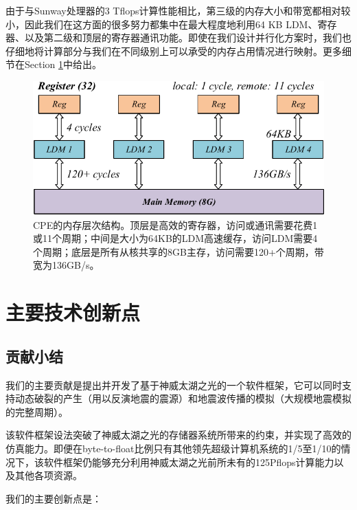 \documentclass[degree=doctor]{thuthesis}
\begin{document}
由于与Sunway处理器的3 Tflops计算性能相比，第三级的内存大小和带宽都相对较小，因此我们在这方面的很多努力都集中在最大程度地利用64 KB LDM、寄存器、以及第二级和顶层的寄存器通讯功能。即使在我们设计并行化方案时，我们也仔细地将计算部分与我们在不同级别上可以承受的内存占用情况进行映射。更多细节在Section \ref{sec:contribution}中给出。

\begin{figure}[h]
\centering
\includegraphics[width=.9\columnwidth]{memory_hierarchy.pdf}
\caption{CPE的内存层次结构。顶层是高效的寄存器，访问或通讯需要花费1或11个周期；中间是大小为64KB的LDM高速缓存，访问LDM需要4个周期；底层是所有从核共享的8GB主存，访问需要120+个周期，带宽为136GB/s。}
\label{fig:sunway_mem}
\end{figure}

\section{主要技术创新点}
\label{sec:contribution}

\subsection{贡献小结}


我们的主要贡献是提出并开发了基于神威太湖之光的一个软件框架，它可以同时支持动态破裂的产生（用以反演地震的震源）和地震波传播的模拟（大规模地震模拟的完整周期）。

该软件框架设法突破了神威太湖之光的存储器系统所带来的约束，并实现了高效的仿真能力。即便在byte-to-float比例只有其他领先超级计算机系统的1/5至1/10的情况下，该软件框架仍能够充分利用神威太湖之光前所未有的125Pflops计算能力以及其他各项资源。

我们的主要创新点是：
\end{document}
